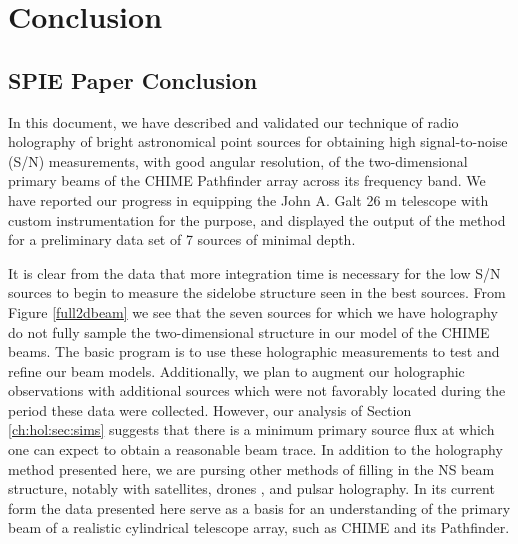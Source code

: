 \chapter{Conclusion}

\section{SPIE Paper Conclusion} \label{ch:conclusion:sec:hol}

In this document, we have described and validated our technique of radio holography of bright astronomical point sources for obtaining high signal-to-noise (S/N) measurements, with good angular resolution, of the two-dimensional primary beams of the CHIME Pathfinder array across its frequency band. We have reported our progress in equipping the John A. Galt 26 m telescope with custom instrumentation for the purpose, and displayed the output of the method for a preliminary data set of 7 sources of minimal depth. 

It is clear from the data that more integration time is necessary for the low S/N sources to begin to measure the sidelobe structure seen in the best sources. From Figure \ref{full2dbeam} we see that the seven sources for which we have holography do not fully sample the two-dimensional structure in our model of the CHIME beams. The basic program is to use these holographic measurements to test and refine our beam models. Additionally, we plan to augment our holographic observations with additional sources which were not favorably located during the period these data were collected. However, our analysis of Section \ref{ch:hol:sec:sims} suggests that there is a minimum primary source flux at which one can expect to obtain a reasonable beam trace. In addition to the holography method presented here, we are pursing other methods of filling in the NS beam structure, notably with satellites\citep{hol2, sat2}, drones \citep{drone}, and pulsar holography. In its current form the data presented here serve as a basis for an understanding of the primary beam of a realistic cylindrical telescope array, such as CHIME and its Pathfinder.

